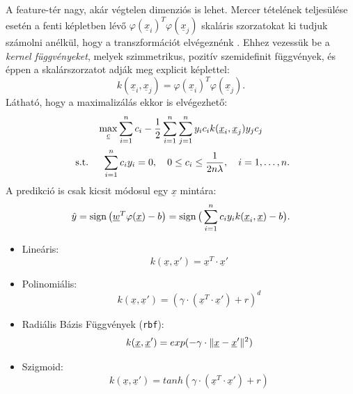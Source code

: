 

A feature-tér nagy, akár végtelen dimenziós is lehet. Mercer tételének teljesülése esetén a fenti képletben lévő
$ \varphi(\underline{x}_i)^T \varphi(\underline{x}_j) $ skaláris szorzatokat ki tudjuk számolni anélkül, hogy a transzformációt 
elvégeznénk \cite{hofmann2008kernel}.
Ehhez vezessük be a \textit{kernel függvényeket}, melyek szimmetrikus, pozitív szemidefinit függvények, és éppen a skalárszorzatot adják meg explicit képlettel:
\[
k(\underline{x}_i, \underline{x}_j) = \varphi(\underline{x}_i)^T \varphi(\underline{x}_j).
\]
Látható, hogy a maximalizálás ekkor is elvégezhető:
\begin{multline*}
\max\limits_{\underline{c}} \sum\limits_{i=1}^{n}c_i - 
\frac{1}{2}\sum\limits_{{i}=1}^{n}\sum\limits_{{j}=1}^{n} y_i c_i k(\underline{x}_i, \underline{x}_j) y_j c_j \\
\text{ s.t. } \quad 
\sum\limits_{{i}=1}^{n} c_i y_i = 0, \quad
0 \leq c_i \leq \frac{1}{2n\lambda}, \quad 
i=1,\dots,n.
\end{multline*}
A predikció is csak kicsit módosul egy $ \underline{x} $ mintára:
\[
\hat{y} = \operatorname{sign}\big(\underline{w}^T \varphi(\underline{x}) - b\big) = \operatorname{sign}\big(\sum\limits_{{i}=1}^{n} c_i y_i k(\underline{x}_i, \underline{x}) - b\big).
\]

\label{sec:kernelek}

\begin{itemize}

\item 
Lineáris:
\[  k(\underline{x}, \underline{x}') = \underline{x}^T \cdot \underline{x}'  \]

\item 
Polinomiális:
\[  k(\underline{x}, \underline{x}') = (\gamma \cdot (\underline{x}^T \cdot \underline{x}') + r)^d  \]

\item 
Radiális Bázis Függvények (\texttt{rbf}):
\[  k(\underline{x}, \underline{x}') = exp( - \gamma \cdot \lVert\underline{x} - \underline{x}'\rVert^2)  \]

\item 
Szigmoid: 
\[  
k(\underline{x}, \underline{x}') = tanh(\gamma \cdot (\underline{x}^T \cdot \underline{x}') + r)  
\]

\end{itemize}


